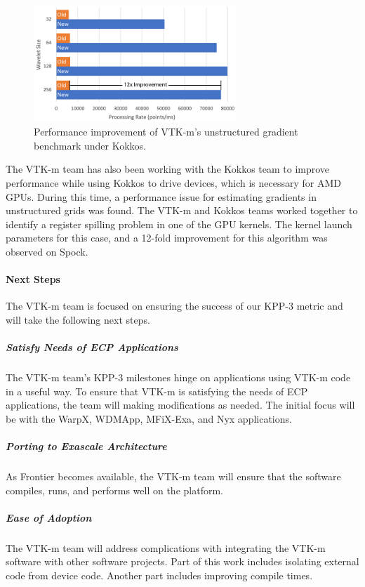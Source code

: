 \begin{figure}[ht]
  \centering
  \includegraphics[width=3in]{projects/2.3.4-DataViz/2.3.4.13-ECP-VTK-m/VTKm-spock-timing.png}
  \caption{Performance improvement of VTK-m's unstructured gradient benchmark under Kokkos.}
  \label{fig:VTKmPerf}
\end{figure}

The VTK-m team has also been working with the Kokkos team to improve performance while using Kokkos to drive devices, which is necessary for AMD GPUs.
During this time, a performance issue for estimating gradients in unstructured grids was found.
The VTK-m and Kokkos teams worked together to identify a register spilling problem in one of the GPU kernels.
The kernel launch parameters for this case, and a 12-fold improvement for this algorithm was observed on Spock.

\paragraph{Next Steps}
The VTK-m team is focused on ensuring the success of our KPP-3 metric and will take the following next steps.


\subparagraph{Satisfy Needs of ECP Applications}
  The VTK-m team's KPP-3 milestones hinge on applications using VTK-m code in a useful way.
  To ensure that VTK-m is satisfying the needs of ECP applications, the team will making modifications as needed.
  The initial focus will be with the WarpX, WDMApp, MFiX-Exa, and Nyx applications.
\subparagraph{Porting to Exascale Architecture}
  As Frontier becomes available, the VTK-m team will ensure that the software compiles, runs, and performs well on the platform.
\subparagraph{Ease of Adoption}
  The VTK-m team will address complications with integrating the VTK-m software with other software projects.
  Part of this work includes isolating external code from device code.
  Another part includes improving compile times.

